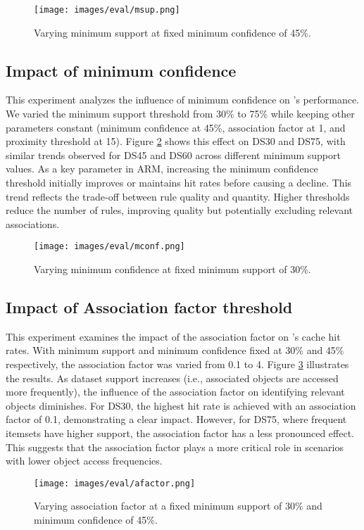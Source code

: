        \begin{figure}[h]
            \centering
            \texttt{[image: images/eval/msup.png]}
            \caption{Varying minimum support at fixed minimum confidence of 45\%. }
            \label{fig:msup}
        \end{figure}
            
    \subsection{Impact of minimum confidence}
        This experiment analyzes the influence of minimum confidence on \spaarc's performance. We varied the minimum support threshold from 30\% to 75\% while keeping other parameters constant (minimum confidence at 45\%, association factor at 1, and proximity threshold at 15). Figure \ref{fig:mconf} shows this effect on DS30 and DS75, with similar trends observed for DS45 and DS60 across different minimum support values. As a key parameter in ARM, increasing the minimum confidence threshold initially improves or maintains hit rates before causing a decline. This trend reflects the trade-off between rule quality and quantity. Higher thresholds reduce the number of rules, improving quality but potentially excluding relevant associations. 
        
        \begin{figure}[h]
            \centering
            \texttt{[image: images/eval/mconf.png]}
            \caption{Varying minimum confidence at fixed minimum support of 30\%.}
            \label{fig:mconf}
        \end{figure}

    \subsection{Impact of Association factor threshold}
        This experiment examines the impact of the association factor on \spaarc's cache hit rates. With minimum support and minimum confidence fixed at 30\% and 45\% respectively, the association factor was varied from 0.1 to 4. Figure \ref{fig:afactor} illustrates the results. As dataset support increases (i.e., associated objects are accessed more frequently), the influence of the association factor on identifying relevant objects diminishes.  For DS30, the highest hit rate is achieved with an association factor of 0.1, demonstrating a clear impact. However, for DS75, where frequent itemsets have higher support, the association factor has a less pronounced effect. This suggests that the association factor plays a more critical role in scenarios with lower object access frequencies.
        \begin{figure}[h]
            \centering
            \texttt{[image: images/eval/afactor.png]}
            \caption{Varying association factor at a fixed minimum support of 30\% and minimum confidence of 45\%.}
            \label{fig:afactor}
        \end{figure}

